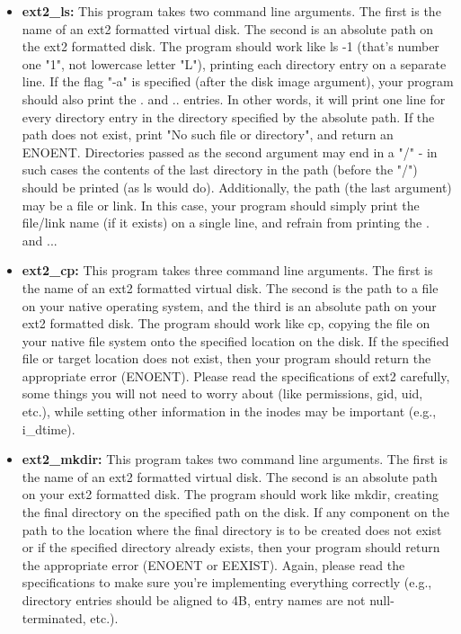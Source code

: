 \documentclass[12pt]{article}
\begin{document}
\begin{itemize}
    \item \textbf{ext2\_ls:} This program takes two command line arguments. The
    first is the name of an ext2 formatted virtual disk. The second is an
    absolute path on the ext2 formatted disk. The program should work like ls -1
    (that's number one "1", not lowercase letter "L"), printing each directory
    entry on a separate line. If the flag "-a" is specified (after the disk
    image argument), your program should also print the . and .. entries. In other
    words, it will print one line for every directory entry in the directory
    specified by the absolute path. If the path does not exist, print "No such
    file or directory", and return an ENOENT. Directories passed as the second
    argument may end in a "/" - in such cases the contents of the last directory
    in the path (before the "/") should be printed (as ls would do). Additionally,
    the path (the last argument) may be a file or link. In this case, your program
    should simply print the file/link name (if it exists) on a single line, and
    refrain from printing the . and ...

    \item \textbf{ext2\_cp:} This program takes three command line arguments. The
    first is the name of an ext2 formatted virtual disk. The second is the path
    to a file on your native operating system, and the third is an absolute path
    on your ext2 formatted disk. The program should work like cp, copying the
    file on your native file system onto the specified location on the disk.
    If the specified file or target location does not exist, then your program
    should return the appropriate error (ENOENT). Please read the specifications
    of ext2 carefully, some things you will not need to worry about (like permissions,
    gid, uid, etc.), while setting other information in the inodes may be important
    (e.g., i\_dtime).

    \item \textbf{ext2\_mkdir:} This program takes two command line arguments.
    The first is the name of an ext2 formatted virtual disk. The second is an
    absolute path on your ext2 formatted disk. The program should work like mkdir,
    creating the final directory on the specified path on the disk. If any component
    on the path to the location where the final directory is to be created does
    not exist or if the specified directory already exists, then your program
    should return the appropriate error (ENOENT or EEXIST). Again, please read
    the specifications to make sure you're implementing everything correctly
    (e.g., directory entries should be aligned to 4B, entry names are not
    null-terminated, etc.).


\end{itemize}
\end{document}
